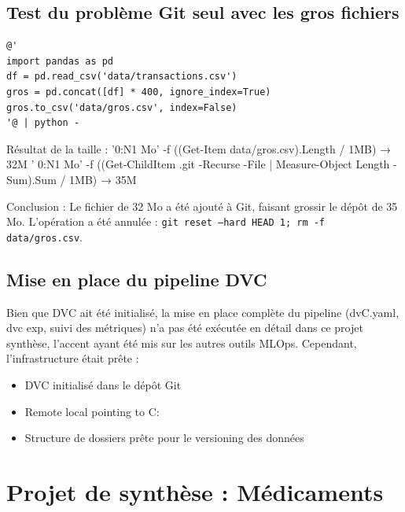 \documentclass[12pt,a4paper]{report}
\begin{document}
\section{Test du problème Git seul avec les gros fichiers}
\begin{verbatim}
@'
import pandas as pd
df = pd.read_csv('data/transactions.csv')
gros = pd.concat([df] * 400, ignore_index=True)
gros.to_csv('data/gros.csv', index=False)
'@ | python -
\end{verbatim}
Résultat de la taille : '{0:N1} Mo' -f ((Get-Item data/gros.csv).Length / 1MB) → 32M
' {0:N1} Mo' -f ((Get-ChildItem .git -Recurse -File | Measure-Object Length -Sum).Sum / 1MB) → 35M

Conclusion : Le fichier de 32 Mo a été ajouté à Git, faisant grossir le dépôt de 35 Mo. L'opération a été annulée : \texttt{git reset --hard HEAD~1; rm -f data/gros.csv}.

\section{Mise en place du pipeline DVC}
Bien que DVC ait été initialisé, la mise en place complète du pipeline (dvC.yaml, dvc exp, suivi des métriques) n'a pas été exécutée en détail dans ce projet synthèse, l'accent ayant été mis sur les autres outils MLOps. Cependant, l'infrastructure était prête :
\begin{itemize}
    \item DVC initialisé dans le dépôt Git
    \item Remote local pointing to C:\dvcstore
    \item Structure de dossiers prête pour le versioning des données
\end{itemize}

\chapter{Projet de synthèse : Médicaments}
\end{document}
